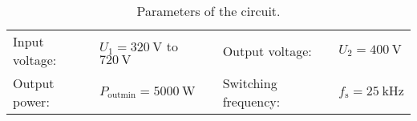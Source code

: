 \begin{table}[ht]
    \centering  %
    \begin{tabular}{llll}
        \toprule
        
        Input voltage: &  $U_{\mathrm{1}} = \SI{320}{\volt}$ to $\SI{720}{\volt}$ & Output voltage: & $U_{\mathrm{2}} = \SI{400}{\volt}$ \\ 
        Output power: & $P_{\mathrm{outmin}} = \SI{5000}{\watt}$ & Switching frequency: & $f_{\mathrm{s}} = \SI{25}{\kilo\hertz}$ \\ 
        \bottomrule
    \end{tabular}
    \caption{Parameters of the circuit.}  %
    \label{table:Parameters of the buck-boost converter.}
\end{table}